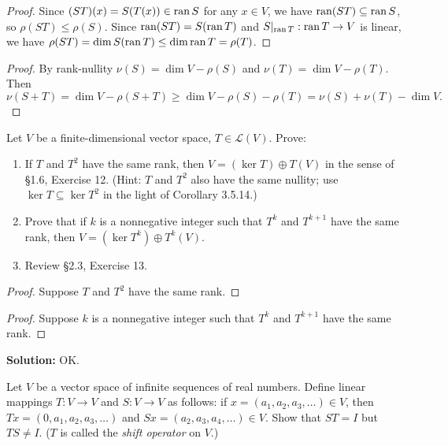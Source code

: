 \begin{proof}
    Since $(ST)(x) = S(T(x)) \in \operatorname{ran} S$ for any $x \in V$, we have 
    $\operatorname{ran}(ST) \subseteq \operatorname{ran} S$, so $\rho(ST) \le \rho(S)$.
    Since $\operatorname{ran}(ST) = S(\operatorname{ran} T)$ and $S|_{\operatorname{ran} T} : \operatorname{ran} T \to V$ is linear,
    we have $\rho(ST) = \dim S(\operatorname{ran} T) \le \dim \operatorname{ran} T = \rho(T)$.
\end{proof}

\begin{proof}
    By rank-nullity $\nu(S) = \dim V - \rho(S)$ and $\nu(T) = \dim V - \rho(T)$. Then
    \[\nu(S + T) = \dim V - \rho(S + T) \ge \dim V - \rho(S) - \rho(T) = \nu(S) + \nu(T) - \dim V.\]
\end{proof}

\newpage
\begin{tcolorbox}[title=Problem 4, breakable]
    Let $V$ be a finite-dimensional vector space, $T \in \mathcal{L}(V)$. Prove:
    \begin{enumerate}
        \item[(i)] If $T$ and $T^2$ have the same rank, then $V = (\ker T) \oplus T(V)$ 
        in the sense of \S 1.6, Exercise 12. (Hint: $T$ and $T^2$ also have the same 
        nullity; use $\ker T \subseteq \ker T^2$ in the light of Corollary 3.5.14.)
        \item[(ii)] Prove that if $k$ is a nonnegative integer such that $T^k$ and 
        $T^{k+1}$ have the same rank, then $V = (\ker T^k) \oplus T^k(V)$.
        \item[(iii)] Review \S 2.3, Exercise 13.
    \end{enumerate}
\end{tcolorbox}

\begin{proof}
    Suppose $T$ and $T^2$ have the same rank.
\end{proof}

\begin{proof}
    Suppose $k$ is a nonnegative integer such that $T^k$ and $T^{k + 1}$ have the same rank.
\end{proof}

\textbf{Solution: } OK.

\begin{tcolorbox}[title=Problem 5, breakable]
    Let $V$ be a vector space of infinite sequences of real numbers.
    Define linear mappings $T : V \longrightarrow V$ and $S : V \longrightarrow V$
    as follows: if $x = (a_1, a_2, a_3, \ldots) \in V$, then $Tx = (0, a_1, a_2, a_3, \ldots)$
    and $Sx = (a_2, a_3, a_4, \ldots) \in V$. Show that $ST = I$ but $TS \ne I$. ($T$ 
    is called the \emph{shift operator} on $V$.)
\end{tcolorbox}

